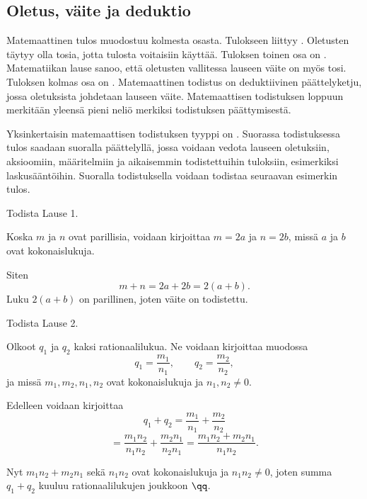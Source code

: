 \subsection*{Oletus, väite ja deduktio} %

Matemaattinen tulos muodostuu kolmesta osasta. Tulokseen liittyy .
Oletusten täytyy olla tosia, jotta tulosta voitaisiin käyttää. Tuloksen toinen osa on .
Matematiikan lause sanoo, että oletusten vallitessa lauseen väite on myös tosi.
Tuloksen kolmas osa on . Matemaattinen todistus on deduktiivinen päättelyketju,
jossa oletuksista johdetaan lauseen väite. Matemaattisen todistuksen loppuun merkitään yleensä
pieni neliö merkiksi todistuksen päättymisestä.

Yksinkertaisin matemaattisen todistuksen tyyppi on .
Suorassa todistuksessa tulos saadaan suoralla päättelyllä, jossa voidaan vedota lauseen oletuksiin,
aksioomiin, määritelmiin ja aikaisemmin todistettuihin tuloksiin, esimerkiksi laskusääntöihin.
Suoralla todistuksella voidaan todistaa seuraavan esimerkin tulos.


\begin{esimerkki}
	Todista Lause 1.
	
	\begin{todistus}
		Koska $m$ ja $n$ ovat parillisia, voidaan kirjoittaa $m=2a$ ja $n=2b$, missä $a$ ja $b$ ovat kokonaislukuja.
		
		Siten
		\[
			m+n =2a+2b = 2(a+b).
		\]
		Luku $2(a+b)$ on parillinen, joten väite on todistettu.
	\end{todistus}
\end{esimerkki}


\begin{esimerkki}
	Todista Lause 2.
	
	\begin{todistus}
		Olkoot $q_1$ ja $q_2$ kaksi rationaalilukua. Ne voidaan kirjoittaa muodossa
		\[
			q_1=\frac{m_1}{n_1},\qquad 
			q_2=\frac{m_2}{n_2},
		\]
		ja missä $m_1, m_2, n_1, n_2$ ovat kokonaislukuja ja $n_1, n_2\neq 0$.

		Edelleen voidaan kirjoittaa
		\[
			q_1+q_2 = \frac{m_1}{n_1}+ \frac{m_2}{n_2}
		\]
		\[
			= \frac{m_1 n_2}{n_1 n_2}+ \frac{m_2 n_1}{n_2 n_1} = \frac{m_1n_2 + m_2 n_1}{n_1 n_2}.
		\]

		Nyt $m_1n_2 + m_2 n_1$ sekä $n_1 n_2$ ovat kokonaislukuja ja $n_1 n_2\neq 0$, joten summa $q_1+q_2$ kuuluu rationaalilukujen joukkoon $\qq$.
	\end{todistus}
\end{esimerkki}


